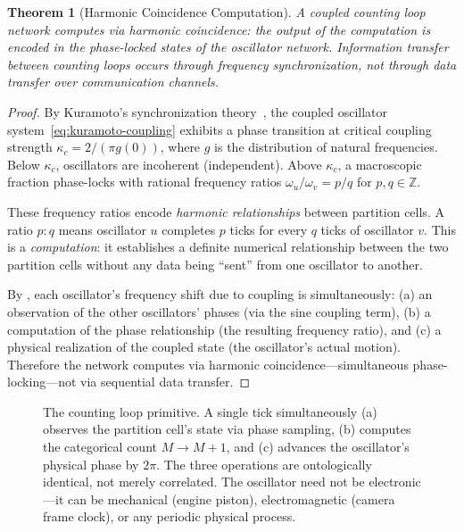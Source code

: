 \documentclass[twocolumn,10pt]{article}
\newtheorem{theorem}{Theorem}[section]
\theoremstyle{definition}
\begin{document}
\begin{theorem}[Harmonic Coincidence Computation]
\label{thm:harmonic-computation}
A coupled counting loop network computes via \emph{harmonic coincidence}: the output of the computation is encoded in the phase-locked states of the oscillator network. Information transfer between counting loops occurs through frequency synchronization, not through data transfer over communication channels.
\end{theorem}

\begin{proof}
By Kuramoto's synchronization theory~\cite{kuramoto1984,strogatz2003}, the coupled oscillator system~\eqref{eq:kuramoto-coupling} exhibits a phase transition at critical coupling strength $\kappa_c = 2/(\pi g(0))$, where $g$ is the distribution of natural frequencies. Below $\kappa_c$, oscillators are incoherent (independent). Above $\kappa_c$, a macroscopic fraction phase-locks with rational frequency ratios $\omega_u / \omega_v = p/q$ for $p, q \in \mathbb{Z}$.

These frequency ratios encode \emph{harmonic relationships} between partition cells. A ratio $p:q$ means oscillator $u$ completes $p$ ticks for every $q$ ticks of oscillator $v$. This is a \emph{computation}: it establishes a definite numerical relationship between the two partition cells without any data being ``sent'' from one oscillator to another.

By , each oscillator's frequency shift due to coupling is simultaneously: (a) an observation of the other oscillators' phases (via the sine coupling term), (b) a computation of the phase relationship (the resulting frequency ratio), and (c) a physical realization of the coupled state (the oscillator's actual motion). Therefore the network computes via harmonic coincidence---simultaneous phase-locking---not via sequential data transfer.
\end{proof}

\begin{figure}[t]
\centering
{}
\caption{The counting loop primitive. A single tick simultaneously (a) observes the partition cell's state via phase sampling, (b) computes the categorical count $M \to M+1$, and (c) advances the oscillator's physical phase by $2\pi$. The three operations are ontologically identical, not merely correlated. The oscillator need not be electronic---it can be mechanical (engine piston), electromagnetic (camera frame clock), or any periodic physical process.}
\label{fig:counting-loop}
\end{figure}
\end{document}
